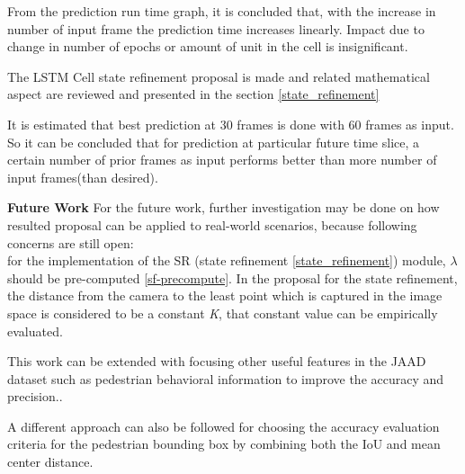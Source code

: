 From the prediction run time graph, it is concluded that, with the increase in number of input frame the prediction time increases linearly. Impact due to change in number of epochs or amount of unit in the cell is insignificant.

The LSTM Cell state refinement proposal is made and related mathematical aspect are reviewed and presented in the section \ref{state_refinement}

It is estimated that best prediction at 30 frames is done with 60 frames as input. So it can be concluded that for prediction at particular future time slice, a certain number of prior frames as input performs better than more number of input frames(than desired).

\newpara

\textbf{Future Work}
For the future work, further investigation may be done on how resulted proposal can be applied to real-world scenarios, because following concerns are still open: \\
for the implementation of the SR (state refinement \ref{state_refinement}) module, $\lambda$ should be pre-computed \ref{sf-precompute}. In the proposal for the state refinement, the distance from the camera to the least point which is captured in the image space is considered to be a constant \textit{K}, that constant value can be empirically evaluated.

This work can be extended with focusing other useful features in the JAAD dataset such as pedestrian behavioral information to improve the accuracy and precision..

A different approach can also be followed for choosing the accuracy evaluation criteria for the pedestrian bounding box by combining both the IoU and mean center distance.
